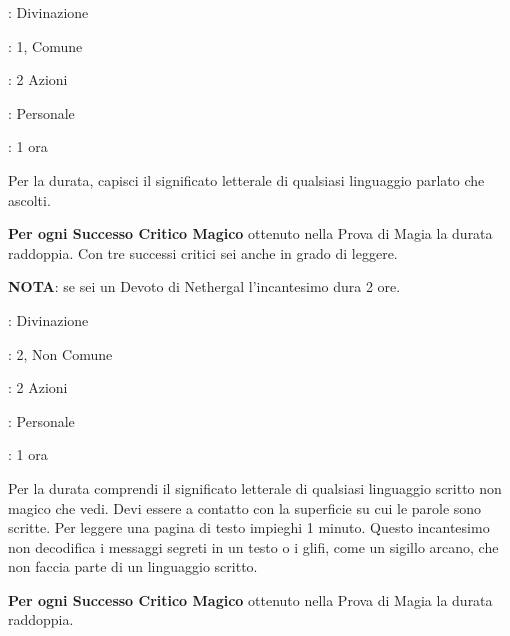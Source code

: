 \begin{multicols}{2}
\noindent\colorbox{OBSSgold!10}{
\begin{minipage}{0.95\linewidth}
\begin{description}[noitemsep, topsep=0pt, parsep=0pt, partopsep=0pt, leftmargin=0cm, labelwidth=1.3cm]
	\item[\textbf{Lista}]: Divinazione
	\item[\textbf{Livello}]: 1, Comune
	\item[\textbf{Lancio}]: 2 Azioni
	\item[\textbf{Gittata}]: Personale
	\item[\textbf{Durata}]: 1 ora
\end{description}
\end{minipage}}\smallskip

Per la durata, capisci il significato letterale di qualsiasi linguaggio parlato che ascolti.

\textbf{Per ogni Successo Critico Magico} ottenuto nella Prova di Magia la durata raddoppia. Con tre successi critici sei anche in grado di leggere.

\textbf{NOTA}: se sei un Devoto di Nethergal l'incantesimo dura 2 ore.

\noindent\colorbox{OBSSgold!10}{
\begin{minipage}{0.95\linewidth}
\begin{description}[noitemsep, topsep=0pt, parsep=0pt, partopsep=0pt, leftmargin=0cm, labelwidth=1.3cm]
	\item[\textbf{Lista}]: Divinazione
	\item[\textbf{Livello}]: 2, Non Comune
	\item[\textbf{Lancio}]: 2 Azioni
	\item[\textbf{Gittata}]: Personale
	\item[\textbf{Durata}]: 1 ora
\end{description}
\end{minipage}}\smallskip

Per la durata comprendi il significato letterale di qualsiasi linguaggio scritto non magico che vedi. Devi essere a contatto con la superficie su cui le parole sono scritte. Per leggere una pagina di testo impieghi 1 minuto. Questo incantesimo non decodifica i messaggi segreti in un testo o i glifi, come un sigillo arcano, che non faccia parte di un linguaggio scritto.

\textbf{Per ogni Successo Critico Magico} ottenuto nella Prova di Magia la durata raddoppia.


\end{multicols}
